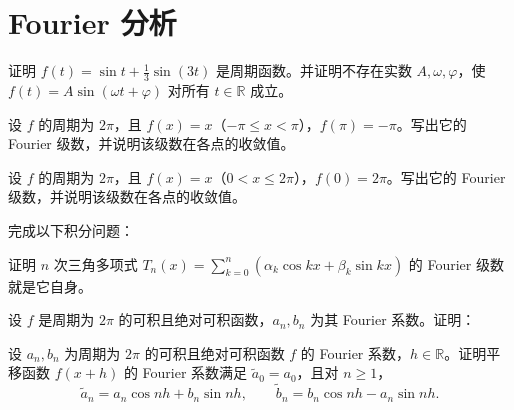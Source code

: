\renewcommand{\thesection}{\arabic{section}}\renewcommand{\theHsection}{chapter.\arabic{section}}\setcounter{section}{16}\section{Fourier 分析}
\noindent\begin{minipage}{\textwidth}
证明 $f(t)=\sin t+\frac13\sin(3t)$ 是周期函数。并证明不存在实数 $A,\omega,\varphi$，使 $f(t)=A\sin(\omega t+\varphi)$ 对所有 $t\in\mathbb R$ 成立。
\end{minipage}\par\vfill
\noindent\begin{minipage}{\textwidth}
设 $f$ 的周期为 $2\pi$，且 $f(x)=x$（$-\pi\le x<\pi$），$f(\pi)=-\pi$。写出它的 Fourier 级数，并说明该级数在各点的收敛值。
\end{minipage}\par\vfill
\noindent\begin{minipage}{\textwidth}
设 $f$ 的周期为 $2\pi$，且 $f(x)=x$（$0<x\le2\pi$），$f(0)=2\pi$。写出它的 Fourier 级数，并说明该级数在各点的收敛值。
\end{minipage}\par\vfill
\newpage
\noindent\begin{minipage}{\textwidth}
完成以下积分问题：
\end{minipage}\par\vfill
\noindent\begin{minipage}{\textwidth}
证明 $n$ 次三角多项式 $\displaystyle T_n(x)=\sum_{k=0}^n(\alpha_k\cos kx+\beta_k\sin kx)$ 的 Fourier 级数就是它自身。
\end{minipage}\par\vfill
\noindent\begin{minipage}{\textwidth}
设 $f$ 是周期为 $2\pi$ 的可积且绝对可积函数，$a_n,b_n$ 为其 Fourier 系数。证明：
\end{minipage}\par\vfill
\newpage
\noindent\begin{minipage}{\textwidth}
设 $a_n,b_n$ 为周期为 $2\pi$ 的可积且绝对可积函数 $f$ 的 Fourier 系数，$h\in\mathbb R$。证明平移函数 $f(x+h)$ 的 Fourier 系数满足 $\widetilde a_0=a_0$，且对 $n\ge1$，\[\widetilde a_n=a_n\cos nh+b_n\sin nh,\qquad\widetilde b_n=b_n\cos nh-a_n\sin nh.\]
\end{minipage}\par\vfill
